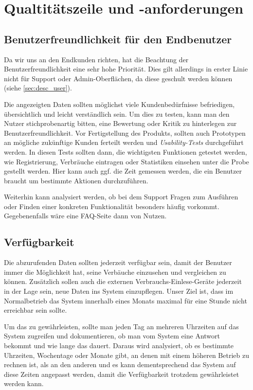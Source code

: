 \section{Qualtitätszeile und -anforderungen}

\subsection{Benutzerfreundlichkeit für den Endbenutzer}
Da wir uns an den Endkunden richten, hat die Beachtung der Benutzerfreundlichkeit eine sehr hohe Priorität. Dies gilt allerdings in erster Linie nicht für Support oder Admin-Oberflächen, da diese geschult werden können (siehe \ref{sec:desc_user}).

Die angezeigten Daten sollten möglichst viele Kundenbedürfnisse
befriedigen, übersichtlich und leicht verständlich sein.
Um dies zu testen, kann man den Nutzer stichprobenartig bitten, eine Bewertung oder Kritik zu hinterlegen zur Benutzerfreundlichkeit.
Vor Fertigstellung des Produkts, sollten auch Prototypen an mögliche zukünftige Kunden ferteilt werden und \textit{Usability-Tests} durchgeführt werden. In diesen Tests sollten dann, die wichtigsten Funktionen getestet werden, wie Registrierung, Verbräuche eintragen oder Statistiken einsehen unter die Probe gestellt werden.
Hier kann auch ggf. die Zeit gemessen werden, die ein Benutzer braucht um bestimmte Aktionen durchzuführen.

Weiterhin kann analysiert werden, ob bei dem Support Fragen zum Ausführen oder Finden einer konkreten Funktionalität besonders häufig vorkommt. Gegebenenfalls wäre eine FAQ-Seite dann von Nutzen.

\subsection{Verfügbarkeit}
Die abzurufenden Daten sollten jederzeit verfügbar sein,
damit der Benutzer immer die Möglichkeit hat,
seine Verbäuche einzusehen und vergleichen zu können. Zusätzlich sollen auch die externen Verbrauchs-Einlese-Geräte jederzeit in der Lage sein, neue Daten ins System einzupflegen.
Unser Ziel ist, dass im Normalbetrieb das System innerhalb eines Monats maximal für eine Stunde nicht erreichbar sein sollte.

Um das zu gewährleisten, sollte man jeden Tag an mehreren Uhrzeiten auf das System zugreifen
und dokumentieren, ob man vom System eine Antwort bekommt und wie lange das dauert.
Daraus wird analysiert, ob es bestimmte Uhrzeiten, Wochentage oder Monate gibt,
an denen mit einem höheren Betrieb zu rechnen ist, als an den anderen und es kann dementsprechend das
System auf diese Zeiten angepasst werden, damit die Verfügbarkeit trotzdem gewährleistet werden kann.

